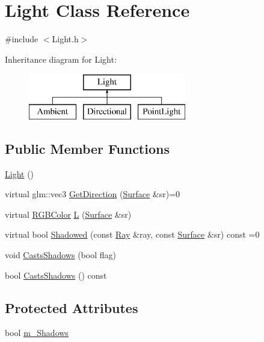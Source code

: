\hypertarget{class_light}{}\section{Light Class Reference}
\label{class_light}


{\ttfamily \#include $<$Light.\+h$>$}

Inheritance diagram for Light\+:\begin{figure}[H]
\begin{center}
\leavevmode
\includegraphics[height=2.000000cm]{class_light}
\end{center}
\end{figure}
\subsection*{Public Member Functions}
\begin{DoxyCompactItemize}
\item 
\hyperlink{class_light_aeb5df09a25a32f19fdffa761268ba24f}{Light} ()
\item 
virtual glm\+::vec3 \hyperlink{class_light_a62c5f73131ca1cdd6b2477f36c242482}{Get\+Direction} (\hyperlink{class_surface}{Surface} \&sr)=0
\item 
virtual \hyperlink{class_r_g_b_color}{R\+G\+B\+Color} \hyperlink{class_light_aba4ca1dcd52876cb5bee71ac8f684af5}{L} (\hyperlink{class_surface}{Surface} \&sr)
\item 
virtual bool \hyperlink{class_light_ac96c5efcdccb339609c7d19ea6ac5d17}{Shadowed} (const \hyperlink{class_ray}{Ray} \&ray, const \hyperlink{class_surface}{Surface} \&sr) const =0
\item 
void \hyperlink{group___lights_ga87d9f95e8a6d77b8fd8383b68daa23ff}{Casts\+Shadows} (bool flag)
\item 
bool \hyperlink{group___lights_gad1397ab09ba91ed92dbbeb0c8fa8bedc}{Casts\+Shadows} () const
\end{DoxyCompactItemize}
\subsection*{Protected Attributes}
\begin{DoxyCompactItemize}
\item 
bool \hyperlink{class_light_a84dea3da6749bb4ee4b141744344b403}{m\+\_\+\+Shadows}
\end{DoxyCompactItemize}



